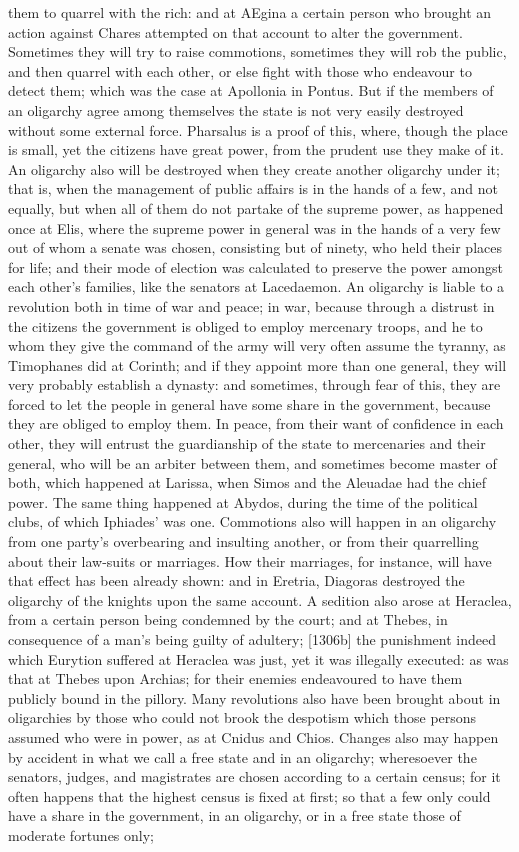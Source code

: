 \documentclass[12pt]{article}
\begin{document}
them to quarrel with the rich: and at AEgina a certain person who brought an action against Chares attempted on that account to alter the government. Sometimes they will try to raise commotions, sometimes they will rob the public, and then quarrel with each other, or else fight with those who endeavour to detect them; which was the case at Apollonia in Pontus. But if the members of an oligarchy agree among themselves the state is not very easily destroyed without some external force. Pharsalus is a proof of this, where, though the place is small, yet the citizens have great power, from the prudent use they make of it. An oligarchy also will be destroyed when they create another oligarchy under it; that is, when the management of public affairs is in the hands of a few, and not equally, but when all of them do not partake of the supreme power, as happened once at Elis, where the supreme power in general was in the hands of a very few out of whom a senate was chosen, consisting but of ninety, who held their places for life; and their mode of election was calculated to preserve the power amongst each other's families, like the senators at Lacedaemon. An oligarchy is liable to a revolution both in time of war and peace; in war, because through a distrust in the citizens the government is obliged to employ mercenary troops, and he to whom they give the command of the army will very often assume the tyranny, as Timophanes did at Corinth; and if they appoint more than one general, they will very probably establish a dynasty: and sometimes, through fear of this, they are forced to let the people in general have some share in the government, because they are obliged to employ them. In peace, from their want of confidence in each other, they will entrust the guardianship of the state to mercenaries and their general, who will be an arbiter between them, and sometimes become master of both, which happened at Larissa, when Simos and the Aleuadae had the chief power. The same thing happened at Abydos, during the time of the political clubs, of which Iphiades' was one. Commotions also will happen in an oligarchy from one party's overbearing and insulting another, or from their quarrelling about their law-suits or marriages. How their marriages, for instance, will have that effect has been already shown: and in Eretria, Diagoras destroyed the oligarchy of the knights upon the same account. A sedition also arose at Heraclea, from a certain person being condemned by the court; and at Thebes, in consequence of a man's being guilty of adultery; [1306b] the punishment indeed which Eurytion suffered at Heraclea was just, yet it was illegally executed: as was that at Thebes upon Archias; for their enemies endeavoured to have them publicly bound in the pillory. Many revolutions also have been brought about in oligarchies by those who could not brook the despotism which those persons assumed who were in power, as at Cnidus and Chios. Changes also may happen by accident in what we call a free state and in an oligarchy; wheresoever the senators, judges, and magistrates are chosen according to a certain census; for it often happens that the highest census is fixed at first; so that a few only could have a share in the government, in an oligarchy, or in a free state those of moderate fortunes only; 
\end{document}
